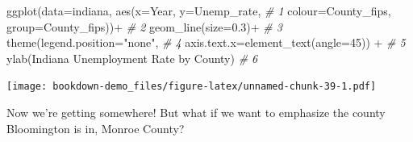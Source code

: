 \documentclass[
]{book}
\newenvironment{Shaded}{\begin{snugshade}}{\end{snugshade}}
\newcommand{\AttributeTok}[1]{\textcolor[rgb]{0.77,0.63,0.00}{#1}}
\newcommand{\CommentTok}[1]{\textcolor[rgb]{0.56,0.35,0.01}{\textit{#1}}}
\newcommand{\DecValTok}[1]{\textcolor[rgb]{0.00,0.00,0.81}{#1}}
\newcommand{\FloatTok}[1]{\textcolor[rgb]{0.00,0.00,0.81}{#1}}
\newcommand{\FunctionTok}[1]{\textcolor[rgb]{0.00,0.00,0.00}{#1}}
\newcommand{\NormalTok}[1]{#1}
\newcommand{\SpecialCharTok}[1]{\textcolor[rgb]{0.00,0.00,0.00}{#1}}
\newcommand{\StringTok}[1]{\textcolor[rgb]{0.31,0.60,0.02}{#1}}
\begin{document}
\begin{Shaded}
\begin{Highlighting}[]
\FunctionTok{ggplot}\NormalTok{(}\AttributeTok{data=}\NormalTok{indiana, }\FunctionTok{aes}\NormalTok{(}\AttributeTok{x=}\NormalTok{Year, }\AttributeTok{y=}\NormalTok{Unemp\_rate,   }\CommentTok{\# 1}
    \AttributeTok{colour=}\NormalTok{County\_fips, }\AttributeTok{group=}\NormalTok{County\_fips))}\SpecialCharTok{+}     \CommentTok{\# 2}
  \FunctionTok{geom\_line}\NormalTok{(}\AttributeTok{size=}\FloatTok{0.3}\NormalTok{)}\SpecialCharTok{+}                           \CommentTok{\# 3}
  \FunctionTok{theme}\NormalTok{(}\AttributeTok{legend.position=}\StringTok{"none"}\NormalTok{,                  }\CommentTok{\# 4}
    \AttributeTok{axis.text.x=}\FunctionTok{element\_text}\NormalTok{(}\AttributeTok{angle=}\DecValTok{45}\NormalTok{)) }\SpecialCharTok{+}        \CommentTok{\# 5}
  \FunctionTok{ylab}\NormalTok{(}\StringTok{\textquotesingle{}Indiana Unemployment Rate by County\textquotesingle{}}\NormalTok{)    }\CommentTok{\# 6}
\end{Highlighting}
\end{Shaded}

\texttt{[image: bookdown-demo\_files/figure-latex/unnamed-chunk-39-1.pdf]}

Now we're getting somewhere! But what if we want to emphasize the county Bloomington is in, Monroe County?
\end{document}
